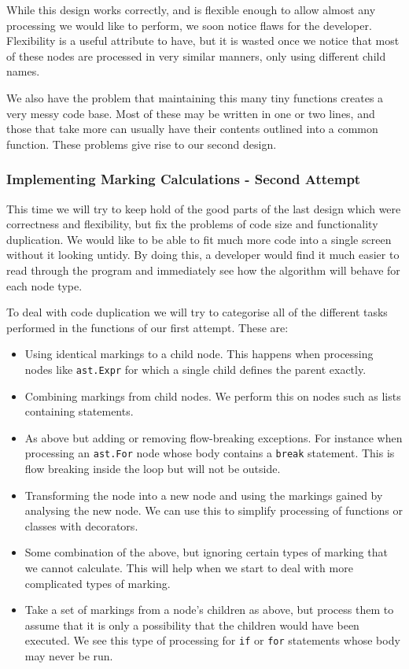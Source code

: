 \documentclass[twoside,a4paper]{report}
\begin{document}
While this design works correctly, and is flexible enough to allow almost any processing we would like to perform, we soon notice flaws for the developer.
Flexibility is a useful attribute to have, but it is wasted once we notice that most of these nodes are processed in very similar manners, only using
different child names.

We also have the problem that maintaining this many tiny functions creates a very messy code base. Most of these may be written in one or two lines, and those
that take more can usually have their contents outlined into a common function. These problems give rise to our second design.

\subsubsection{Implementing Marking Calculations - Second Attempt}

This time we will try to keep hold of the good parts of the last design which were correctness and flexibility, but fix the problems of code size and functionality
duplication. We would like to be able to fit much more code into a single screen without it looking untidy. By doing this, a developer would find it much
easier to read through the program and immediately see how the algorithm will behave for each node type.

To deal with code duplication we will try to categorise all of the different tasks performed in the functions of our first attempt. These are:

\begin{itemize}
\item Using identical markings to a child node. This happens when processing nodes like \texttt{ast.Expr} for which a single child defines the parent exactly.
\item Combining markings from child nodes. We perform this on nodes such as lists containing statements.
\item As above but adding or removing flow-breaking exceptions. For instance when processing an \texttt{ast.For} node whose body contains a \texttt{break}
      statement. This is flow breaking inside the loop but will not be outside.
\item Transforming the node into a new node and using the markings gained by analysing the new node. We can use this to simplify processing of functions
      or classes with decorators.
\item Some combination of the above, but ignoring certain types of marking that we cannot calculate. This will help when we start to deal with more complicated
      types of marking.
\item Take a set of markings from a node's children as above, but process them to assume that it is only a possibility that the children would have been executed. We 
      see this type of processing for \texttt{if} or \texttt{for} statements whose body may never be run.
\end{itemize}
\end{document}

